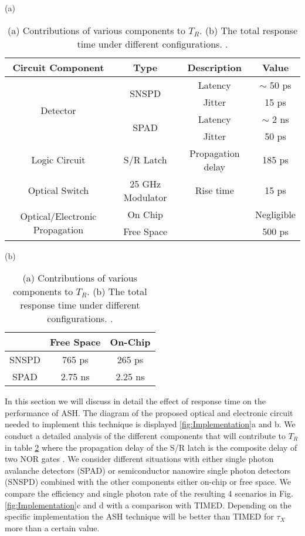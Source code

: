 \documentclass[reprint,onecolumn]{revtex4-1}
\begin{document}
\begin{table}[h!]
(a)

\begin{tabular}{|c|c|c|c|}
\hline 
Circuit Component & Type & Description & Value\tabularnewline
\hline 
\hline 
\multirow{4}{*}{Detector} & \multirow{2}{*}{SNSPD} & Latency & $\sim$ 50 ps \cite{Allmaras2018IntrinsicDetectors}\tabularnewline
\cline{3-4} 
 &  & Jitter & 15 ps \cite{SingleQuantumSingleEos}\tabularnewline
\cline{2-4} 
 & \multirow{2}{*}{SPAD} & Latency & $\sim$ 2 ns \cite{Prochazka2011MeasurementTransfer}\tabularnewline
\cline{3-4} 
 &  & Jitter & 50 ps \cite{PicoQuantGmbHPDMSeries}\tabularnewline
\hline 
Logic Circuit & S/R Latch & Propagation delay & 185 ps \cite{ONSemiconductor2.5V/3.3VSmartGate} \tabularnewline
\hline 
Optical Switch & 25 GHz Modulator & Rise time & 15 ps \cite{iXblueNIR-MX800-LN-10}\tabularnewline
\hline 
\multirow{2}{*}{Optical/Electronic Propagation} & On Chip &  & Negligible\tabularnewline
\cline{2-4} 
 & Free Space &  & 500 ps\tabularnewline
\hline 
\end{tabular}

(b)

\begin{tabular}{c|c|c|}
 & Free Space & On-Chip\tabularnewline
\hline 
\hline 
SNSPD & 765 ps & 265 ps\tabularnewline
\hline 
SPAD & 2.75 ns & 2.25 ns\tabularnewline
\hline 
\end{tabular}

\caption{(a) Contributions of various components to $T_R$. (b) The total response time under different configurations. \label{Tab:TR}.}
\end{table}


In this section we will discuss in detail the effect of response time on the performance of ASH.
The diagram of the proposed optical and electronic circuit needed to implement this technique is displayed \ref{fig:Implementation}a and b. We  conduct a detailed analysis of the different components that will contribute to $T_R$ in table \ref{Tab:TR} where the propagation delay of the S/R latch is the composite delay of two NOR gates \cite{ONSemiconductor2.5V/3.3VSmartGate}. 
We consider different situations with either single photon avalanche detectors (SPAD) or semiconductor nanowire single photon detectors (SNSPD) combined with the other components either on-chip or free space. We compare the efficiency and single photon rate of the resulting 4 scenarios in Fig. \ref{fig:Implementation}c and d with a comparison with TIMED.
Depending on the specific implementation the ASH technique will be better than TIMED for $\tau_X$ more than a certain value. 
\end{document}
